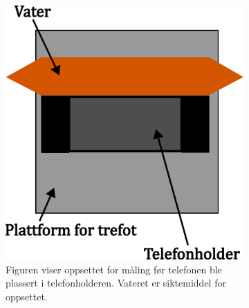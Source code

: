 \begin{figure}[h!]
    \centering
\begin{subfigure}{.47\textwidth}
    \includegraphics[width=\textwidth]{img/Plattform med vater.pdf}
    \caption{Figuren viser oppsettet for måling før telefonen ble plassert i telefonholderen. Vateret er siktemiddel for oppsettet.}
    \label{fig:med_vater}
\end{subfigure}\hfill\begin{subfigure}{.47\textwidth}

\end{subfigure}
\end{figure}
